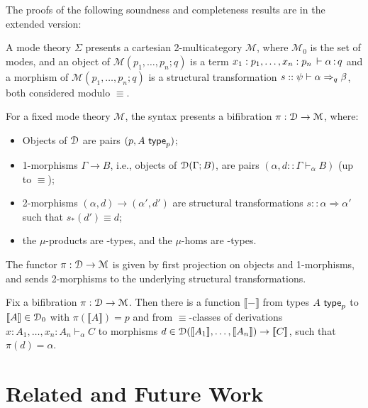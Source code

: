 \documentclass[a4paper,USenglish]{lipics-v2016}
\newcommand\deq{\ensuremath{\equiv}}
\newcommand\spr{\ensuremath{\Rightarrow}} %
\newcommand\seq[3]{\ensuremath{#1 \vdash_{#2} #3}}
\newcommand\Fsymb[0]{\dsd{F}}
\newcommand\Usymb[0]{\dsd{U}}
\newcommand\wftype[2]{\ensuremath{#1 \,\, \dsd{type}_{#2}}}
\renewcommand{\oftp}[3]{\ensuremath{#1 \, \vdash #2 \, \dcd{:} \, #3}}
\def\M{\mathcal{M}}
\def\llb{\llbracket}
\def\rrb{\rrbracket}
\newcommand\Trd[2]{\ensuremath{#1_*(#2)}}
\begin{document}
The proofs of the following soundness and completeness results are in
the extended version:

\begin{theorem}
\label{thm:completeness-mode-theory}
A mode theory $\Sigma$ presents a cartesian 2-multicategory $\M$, where
$\M_0$ is the set of modes, and an object of $\M(p_1,\ldots,p_n;q)$ is a
term $\oftp{x_1:p_1,\ldots,x_n:p_n}{\alpha}{q}$ and a morphism of $\M(p_1,\ldots,p_n;q)$ is a structural transformation
$s :: \wfsp{\psi}{\alpha}{\beta}{q}$, both considered modulo $\deq$.
\end{theorem}

\begin{theorem}
For a fixed mode theory $\M$, the syntax presents a bifibration $\pi : \cD \to \M$, where:
\begin{itemize}
\item Objects of $\mathcal{D}$ are pairs $(p, \wftype{A}{p})$;
\item 1-morphisms $\Gamma \to B$, i.e., objects of $\mathcal{D}(\Gamma; B)$, are pairs $(\alpha, d :: \seq{\Gamma}{\alpha}{B})$ (up to \deq); 
\item 2-morphisms $(\alpha, d) \to (\alpha', d')$ are structural
  transformations $s :: \alpha \spr \alpha'$ such that $\Trd{s}{d'} \deq d$;
\item the $\mu$-products are \Fsymb-types, and the $\mu$-homs are \Usymb-types.
\end{itemize}
The functor $\pi : \cD \to \M$ is given by first projection on objects and 1-morphisms, and sends 2-morphisms to the underlying structural transformations.
\end{theorem}

\begin{theorem}
Fix a bifibration $\pi : \cD \to \M$.  Then there is a function $\llb -
\rrb$ from types \wftype{A}{p} to $\llb A \rrb \in \cD_0$ with $\pi(\llb
A \rrb) = p$ and from $\deq$-classes of derivations $\seq{x:A_1, \ldots,
  x_n:A_n}{\alpha}{C}$ to morphisms $d \in \cD(\llb A_1 \rrb, \dots, \llb
A_n \rrb) \to \llb C \rrb$, such that $\pi(d) = \alpha$.
\end{theorem}


\section{Related and Future Work}
\end{document}
